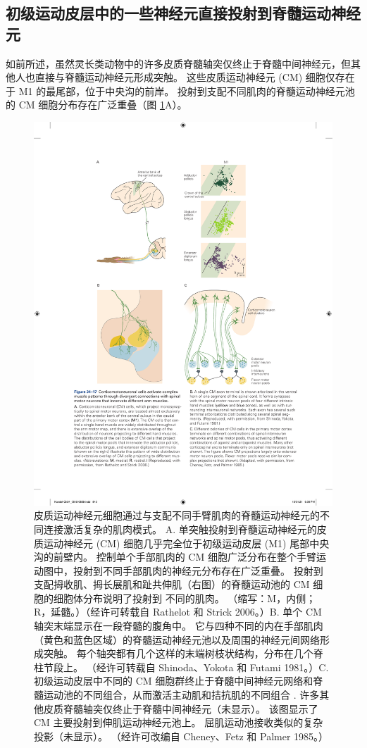 \subsection{初级运动皮层中的一些神经元直接投射到脊髓运动神经元}
如前所述，虽然灵长类动物中的许多皮质脊髓轴突仅终止于脊髓中间神经元，但其他人也直接与脊髓运动神经元形成突触。 这些皮质运动神经元 (CM) 细胞仅存在于 M1 的最尾部，位于中央沟的前岸。 
投射到支配不同肌肉的脊髓运动神经元池的 CM 细胞分布存在广泛重叠（图 \ref{fig:34_17}A）。

\begin{figure}[htbp]
	\centering
	\includegraphics[width=0.75\linewidth]{chap34/fig_34_17}
	\caption{皮质运动神经元细胞通过与支配不同手臂肌肉的脊髓运动神经元的不同连接激活复杂的肌肉模式。 A. 单突触投射到脊髓运动神经元的皮质运动神经元 (CM) 细胞几乎完全位于初级运动皮层 (M1) 尾部中央沟的前壁内。 控制单个手部肌肉的 CM 细胞广泛分布在整个手臂运动图中，投射到不同手部肌肉的神经元分布存在广泛重叠。 投射到支配拇收肌、拇长展肌和趾共伸肌（右图）的脊髓运动池的 CM 细胞的细胞体分布说明了投射到 不同的肌肉。 （缩写：M，内侧；R，延髓。）（经许可转载自 Rathelot 和 Strick 2006。）B. 单个 CM 轴突末端显示在一段脊髓的腹角中。 它与四种不同的内在手部肌肉（黄色和蓝色区域）的脊髓运动神经元池以及周围的神经元间网络形成突触。 每个轴突都有几个这样的末端树枝状结构，分布在几个脊柱节段上。 （经许可转载自 Shinoda、Yokota 和 Futami 1981。）C. 初级运动皮层中不同的 CM 细胞群终止于脊髓中间神经元网络和脊髓运动池的不同组合，从而激活主动肌和拮抗肌的不同组合 . 许多其他皮质脊髓轴突仅终止于脊髓中间神经元（未显示）。 该图显示了 CM 主要投射到伸肌运动神经元池上。 屈肌运动池接收类似的复杂投影（未显示）。 （经许可改编自 Cheney、Fetz 和 Palmer 1985。）}
	\label{fig:34_17}
\end{figure}

